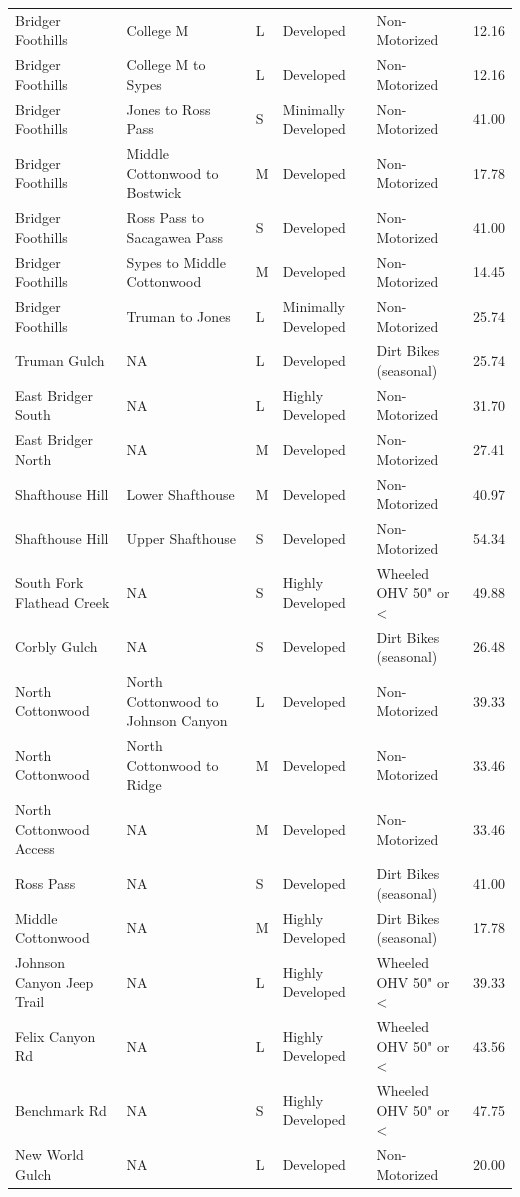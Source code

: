 \documentclass[
]{book}
\begin{document}
\begin{landscape}
\begin{table}
\begin{tabular}[t]{lllllr}
Bridger Foothills & College M & L & Developed & Non-Motorized & 12.16\\
Bridger Foothills & College M to Sypes & L & Developed & Non-Motorized & 12.16\\
\addlinespace
Bridger Foothills & Jones to Ross Pass & S & Minimally Developed & Non-Motorized & 41.00\\
Bridger Foothills & Middle Cottonwood to Bostwick & M & Developed & Non-Motorized & 17.78\\
Bridger Foothills & Ross Pass to Sacagawea Pass & S & Developed & Non-Motorized & 41.00\\
Bridger Foothills & Sypes to Middle Cottonwood & M & Developed & Non-Motorized & 14.45\\
Bridger Foothills & Truman to Jones & L & Minimally Developed & Non-Motorized & 25.74\\
\addlinespace
Truman Gulch & NA & L & Developed & Dirt Bikes (seasonal) & 25.74\\
East Bridger South & NA & L & Highly Developed & Non-Motorized & 31.70\\
East Bridger North & NA & M & Developed & Non-Motorized & 27.41\\
Shafthouse Hill & Lower Shafthouse & M & Developed & Non-Motorized & 40.97\\
Shafthouse Hill & Upper Shafthouse & S & Developed & Non-Motorized & 54.34\\
\addlinespace
South Fork Flathead Creek & NA & S & Highly Developed & Wheeled OHV 50" or < & 49.88\\
Corbly Gulch & NA & S & Developed & Dirt Bikes (seasonal) & 26.48\\
North Cottonwood & North Cottonwood to Johnson Canyon & L & Developed & Non-Motorized & 39.33\\
North Cottonwood & North Cottonwood to Ridge & M & Developed & Non-Motorized & 33.46\\
North Cottonwood Access & NA & M & Developed & Non-Motorized & 33.46\\
\addlinespace
Ross Pass & NA & S & Developed & Dirt Bikes (seasonal) & 41.00\\
Middle Cottonwood & NA & M & Highly Developed & Dirt Bikes (seasonal) & 17.78\\
Johnson Canyon Jeep Trail & NA & L & Highly Developed & Wheeled OHV 50" or < & 39.33\\
Felix Canyon Rd & NA & L & Highly Developed & Wheeled OHV 50" or < & 43.56\\
Benchmark Rd & NA & S & Highly Developed & Wheeled OHV 50" or < & 47.75\\
\addlinespace
New World Gulch & NA & L & Developed & Non-Motorized & 20.00\\
\bottomrule
\end{tabular}
\end{table}
\end{landscape}
\end{document}
